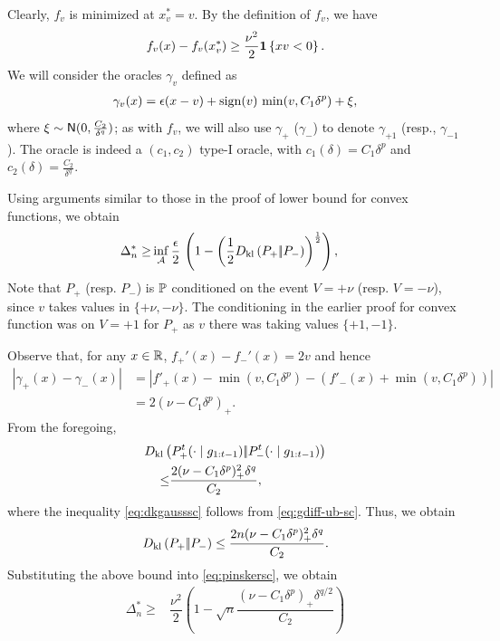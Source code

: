 Clearly, $f_v$ is minimized at $x^*_v = v$.
By the definition of $f_v$, we have
\begin{align}
  f_v(x) - f_v(x^*_v)
\ge  \dfrac{\nu^2}{2}  \indic{x v  < 0}. \label{eq:fv-lb-sc}
\end{align}
We will consider the oracles $\gamma_v$ defined as 
\begin{align}
 \gamma_v(x) = \epsilon(x-v) + \sign(v)\, \min(v,C_1 \delta^p) + \xi, \label{eq:oracle-1d}
\end{align}
where $\xi \sim \normal(0,\frac{C_2}{\delta^q})$; as with $f_v$, we will also use $\gamma_{+}$ ($\gamma_-$) 
to denote $\gamma_{+1}$ (resp., $\gamma_{-1}$).
The oracle is indeed a $(c_1,c_2)$ type-I oracle, with $c_1(\delta)=C_1\delta^p$ and $c_2(\delta)=\frac{C_2}{\delta^q}$.

Using arguments similar to those in the proof of lower bound for convex functions, we obtain
\begin{align}
\Delta_n^{*} %
  \ge  &\inf_{\A} \dfrac{\epsilon }{2}  \,\left( 1 - \left(\frac12\dkl{P_{+}}{P_{-}}\right)^{\frac{1}{2}}\right), \label{eq:pinskersc}
\end{align}
Note that $P_+$ (resp. $P_-$) is $\P$ conditioned on the event $V=+\nu$ (resp. $V=-\nu$), since $v$ takes values in $\{+\nu,-\nu\}$. The conditioning in the earlier proof for convex function was on $V=+1$ for $P_+$ as $v$ there was taking values $\{+1,-1\}$.

Observe that, for any $x\in \R$, $f_+'(x) - f_-'(x) = 2v$ and hence
\begin{align}
 |\gamma_+(x) - \gamma_-(x)| 
& = | f'_+(x) - \min(v,C_1 \delta^p) - (f'_-(x)+\min(v,C_1 \delta^p)) | \nonumber \\
& = 2 (\nu - C_1 \delta^p)_+.
 \label{eq:gdiff-ub-sc}
\end{align}
From the foregoing, 
\begin{align}
 \MoveEqLeft \dkl{P_{+}^t(\cdot\mid g_{1:t-1})}{P_{-}^t(\cdot\mid g_{1:t-1})}\nonumber\\
 \le & \dfrac{2(\nu-C_1\delta^p)_+^2\delta^q}{C_2},\label{eq:dkgausssc}
\end{align}
where the inequality \eqref{eq:dkgausssc} follows from \eqref{eq:gdiff-ub-sc}.
Thus, we obtain
\begin{align}
\dkl{P_{+}}{P_{-}} \le \dfrac{2n(\nu-C_1\delta^p)_+^2 \delta^q}{C_2}.
\end{align}
Substituting the above bound into \eqref{eq:pinskersc}, we obtain 
\begin{align}
 \Delta_n^{*}
  \ge & \dfrac{\nu^2}{2} \left(1 - \sqrt{
    n}  \dfrac{(\nu-C_1\delta^p)_+\delta^{q/2}}{C_2}
  \right)\label{eq:final-lower-bd-sc}
\end{align}



